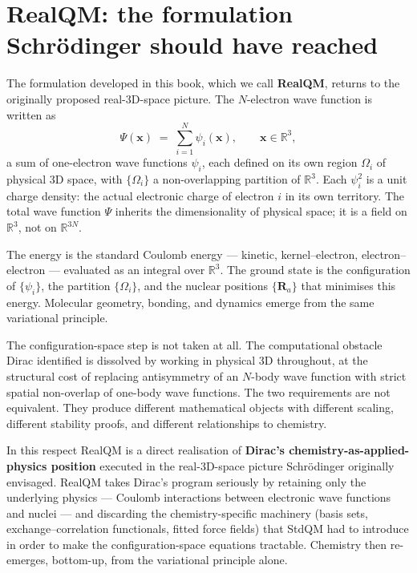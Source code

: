 \section{RealQM: the formulation Schr\"odinger should have reached}

The formulation developed in this book, which we call \textbf{RealQM}, returns to the originally proposed real-3D-space picture. The $N$-electron wave function is written as
\begin{equation}\label{eq:Psi-sum-intro}
\Psi(\mathbf{x}) \;=\; \sum_{i=1}^{N} \psi_i(\mathbf{x}),
\qquad \mathbf{x} \in \mathbb{R}^3,
\end{equation}
a sum of one-electron wave functions $\psi_i$, each defined on its own region $\Omega_i$ of physical 3D space, with $\{\Omega_i\}$ a non-overlapping partition of $\mathbb{R}^3$. Each $\psi_i^2$ is a unit charge density: the actual electronic charge of electron $i$ in its own territory. The total wave function $\Psi$ inherits the dimensionality of physical space; it is a field on $\mathbb{R}^3$, not on $\mathbb{R}^{3N}$.

The energy is the standard Coulomb energy --- kinetic, kernel--electron, electron--electron --- evaluated as an integral over $\mathbb{R}^3$. The ground state is the configuration of $\{\psi_i\}$, the partition $\{\Omega_i\}$, and the nuclear positions $\{\mathbf{R}_a\}$ that minimises this energy. Molecular geometry, bonding, and dynamics emerge from the same variational principle.

The configuration-space step is not taken at all. The computational obstacle Dirac identified is dissolved by working in physical 3D throughout, at the structural cost of replacing antisymmetry of an $N$-body wave function with strict spatial non-overlap of one-body wave functions. The two requirements are not equivalent. They produce different mathematical objects with different scaling, different stability proofs, and different relationships to chemistry.

In this respect RealQM is a direct realisation of \textbf{Dirac's chemistry-as-applied-physics position} executed in the real-3D-space picture Schr\"odinger originally envisaged. RealQM takes Dirac's program seriously by retaining only the underlying physics --- Coulomb interactions between electronic wave functions and nuclei --- and discarding the chemistry-specific machinery (basis sets, exchange--correlation functionals, fitted force fields) that StdQM had to introduce in order to make the configuration-space equations tractable. Chemistry then re-emerges, bottom-up, from the variational principle alone.

